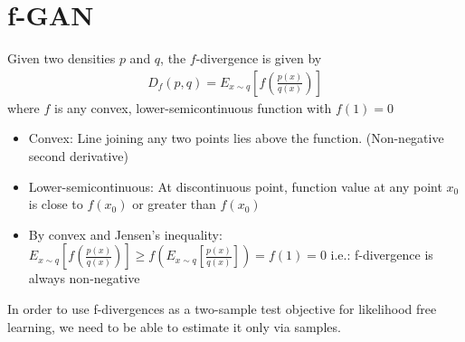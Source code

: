 \section{f-GAN} 
Given two densities $p$ and $q$, the $f$-divergence is given by 
    \begin{align*}
        D_f(p,q) = E_{x\sim q}[f(\frac{p(x)}{q(x)})]
    \end{align*}
where $f$ is any convex, lower-semicontinuous function with $f(1) = 0$
    \begin{itemize}
        \item Convex: Line joining any two points lies above the function. (Non-negative second derivative)
        \item Lower-semicontinuous: At discontinuous point, function value at any point $x_0$ is close to $f(x_0)$ or greater than $f(x_0)$
        \item By convex and Jensen's inequality: $E_{x\sim q}[f(\frac{p(x)}{q(x)})] \geq f(E_{x\sim q}[\frac{p(x)}{q(x)}]) = f(1) = 0$ i.e.: f-divergence is always non-negative 
    \end{itemize}
In order to use f-divergences as a two-sample test objective for likelihood free learning, we need to be able to estimate it only via samples. \\

